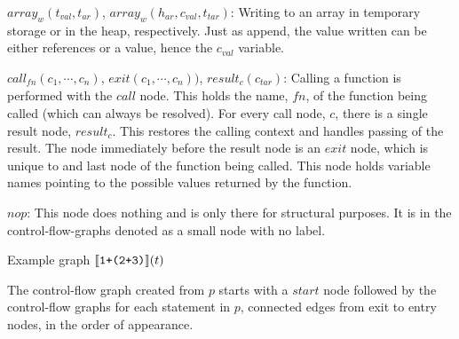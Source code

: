 \begin{description}
\item{$\mathit{array}_w(t_{val}, t_{ar})$, $\mathit{array}_w(h_{ar}, c_{val}, t_{tar})$:} Writing to an array in temporary storage or in the heap, respectively. Just as append, the value written can be either references or a value, hence the $c_{val}$ variable.
\item{$\mathit{call}_{\mathit{fn}}(c_1, \cdots, c_n)$, $\mathit{exit}(c_1, \cdots, c_n))$, $\mathit{result}_{c}(c_{tar})$:} Calling a function is performed with the $\mathit{call}$ node. This holds the name, $\mathit{fn}$, of the function being called (which can always be resolved). For every call node, $c$, there is a single result node, $\mathit{result}_c$. This restores the calling context and handles passing of the result. The node immediately before the result node is an $\mathit{exit}$ node, which is unique to and last node of the function being called. This node holds variable names pointing to the possible values returned by the function. 
\item{$nop$:} This node does nothing and is only there for structural purposes. It is in the control-flow-graphs denoted as a small node with no label.
\end{description}

\begin{graph}
\centering
\begin{adjustbox}{max size={1\textwidth}{.25\textheight}}\end{adjustbox}
\caption{Example graph $\llbracket \texttt{1+(2+3)}\rrbracket(t)$}
\label{graph:exexpr}
\end{graph}

The control-flow graph created from $p$ starts with a $\mathit{start}$ node followed by the control-flow graphs for each statement in $p$, connected edges from exit to entry nodes, in the order of appearance. 

